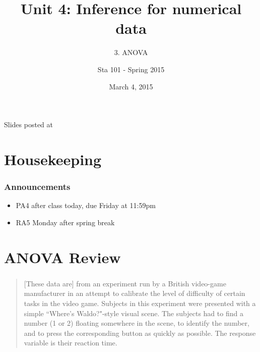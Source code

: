 \documentclass[11pt,containsverbatim,handout,xcolor=xelatex,dvipsnames,table]{beamer}
\title{Unit 4: Inference for numerical data}
\subtitle{3. ANOVA}
\author{Sta 101 - Spring 2015}
\date{March 4, 2015}
\institute{Duke University, Department of Statistical Science}
\begin{document}


\begin{frame}[plain]

\titlepage
\vfill
{\scriptsize {} \hfill Slides posted at  \webLink{\CourseSite}{\CourseSite}}
\addtocounter{framenumber}{-1} 

\end{frame}


\section{Housekeeping}


\begin{frame}
\frametitle{Announcements}

\begin{itemize}

\item PA4 after class today, due Friday at 11:59pm

\item RA5 Monday after spring break

\end{itemize}

\end{frame}


\section{ANOVA Review}


\begin{frame}
  \frametitle{}

\vfill

\begin{quote} 
[These data are] from an experiment run by a British video-game manufacturer in an attempt to calibrate the level of difficulty of certain tasks in the video game. Subjects in this experiment were presented with a simple ``Where's Waldo?"-style visual scene. The subjects had to find a number (1 or 2) floating somewhere in the scene, to identify the number, and to press the corresponding button as quickly as possible. The response variable is their reaction time.
\end{quote}

\vfill


\end{frame}
\end{document}
